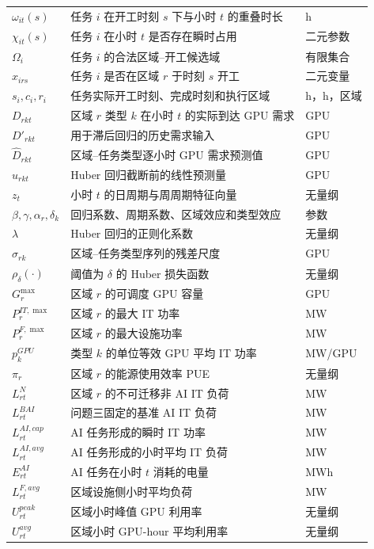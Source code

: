 \documentclass[withoutpreface,bwprint]{cumcmthesis}
\begin{document}
\begin{longtable}{lll}
$\omega_{it}(s)$ & 任务 $i$ 在开工时刻 $s$ 下与小时 $t$ 的重叠时长 & h \\
$\chi_{it}(s)$ & 任务 $i$ 在小时 $t$ 是否存在瞬时占用 & 二元参数 \\
$\Omega_i$ & 任务 $i$ 的合法区域--开工候选域 & 有限集合 \\
$x_{irs}$ & 任务 $i$ 是否在区域 $r$ 于时刻 $s$ 开工 & 二元变量 \\
$s_i,c_i,r_i$ & 任务实际开工时刻、完成时刻和执行区域 & h，h，区域 \\
$D_{rkt}$ & 区域 $r$ 类型 $k$ 在小时 $t$ 的实际到达 GPU 需求 & GPU \\
$D'_{rkt}$ & 用于滞后回归的历史需求输入 & GPU \\
$\widehat D_{rkt}$ & 区域--任务类型逐小时 GPU 需求预测值 & GPU \\
$u_{rkt}$ & Huber 回归截断前的线性预测量 & GPU \\
$z_t$ & 小时 $t$ 的日周期与周周期特征向量 & 无量纲 \\
$\beta,\gamma,\alpha_r,\delta_k$ & 回归系数、周期系数、区域效应和类型效应 & 参数 \\
$\lambda$ & Huber 回归的正则化系数 & 无量纲 \\
$\sigma_{rk}$ & 区域--任务类型序列的残差尺度 & GPU \\
$\rho_{\delta}(\cdot)$ & 阈值为 $\delta$ 的 Huber 损失函数 & 无量纲 \\
$G_r^{\max}$ & 区域 $r$ 的可调度 GPU 容量 & GPU \\
$P_r^{IT,\max}$ & 区域 $r$ 的最大 IT 功率 & MW \\
$P_r^{F,\max}$ & 区域 $r$ 的最大设施功率 & MW \\
$p_k^{GPU}$ & 类型 $k$ 的单位等效 GPU 平均 IT 功率 & MW/GPU \\
$\pi_r$ & 区域 $r$ 的能源使用效率 PUE & 无量纲 \\
$L_{rt}^{N}$ & 区域 $r$ 的不可迁移非 AI IT 负荷 & MW \\
$L_{rt}^{BAI}$ & 问题三固定的基准 AI IT 负荷 & MW \\
$L_{rt}^{AI,cap}$ & AI 任务形成的瞬时 IT 功率 & MW \\
$L_{rt}^{AI,avg}$ & AI 任务形成的小时平均 IT 负荷 & MW \\
$E_{rt}^{AI}$ & AI 任务在小时 $t$ 消耗的电量 & MWh \\
$L_{rt}^{F,avg}$ & 区域设施侧小时平均负荷 & MW \\
$U_{rt}^{peak}$ & 区域小时峰值 GPU 利用率 & 无量纲 \\
$U_{rt}^{avg}$ & 区域小时 GPU-hour 平均利用率 & 无量纲 \\

\end{longtable}
\end{document}
